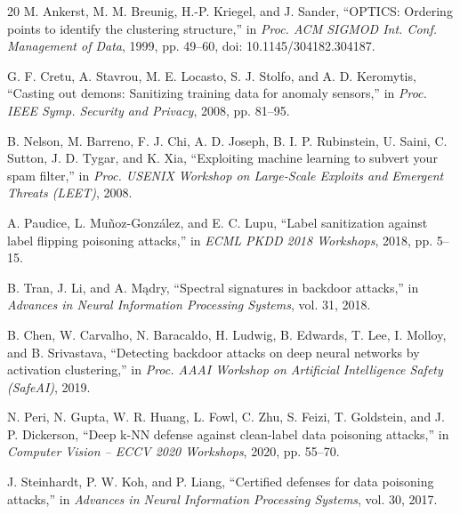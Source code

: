 \documentclass[conference]{IEEEtran}
\begin{document}
\begin{thebibliography}{20}
M. Ankerst, M. M. Breunig, H.-P. Kriegel, and J. Sander, ``OPTICS: Ordering
points to identify the clustering structure,'' in \emph{Proc. ACM SIGMOD Int.
Conf. Management of Data}, 1999, pp. 49--60,
doi: 10.1145/304182.304187.

G. F. Cretu, A. Stavrou, M. E. Locasto, S. J. Stolfo, and A. D. Keromytis, ``Casting
out demons: Sanitizing training data for anomaly sensors,'' in \emph{Proc. IEEE Symp.
Security and Privacy}, 2008, pp. 81--95.

B. Nelson, M. Barreno, F. J. Chi, A. D. Joseph, B. I. P. Rubinstein, U. Saini,
C. Sutton, J. D. Tygar, and K. Xia, ``Exploiting machine learning to subvert your spam
filter,'' in \emph{Proc. USENIX Workshop on Large-Scale Exploits and Emergent Threats
(LEET)}, 2008.

A. Paudice, L. Mu\~{n}oz-Gonz\'{a}lez, and E. C. Lupu, ``Label sanitization against
label flipping poisoning attacks,'' in \emph{ECML PKDD 2018 Workshops}, 2018,
pp. 5--15.

B. Tran, J. Li, and A. M\k{a}dry, ``Spectral signatures in backdoor attacks,'' in
\emph{Advances in Neural Information Processing Systems}, vol. 31, 2018.

B. Chen, W. Carvalho, N. Baracaldo, H. Ludwig, B. Edwards, T. Lee, I. Molloy, and
B. Srivastava, ``Detecting backdoor attacks on deep neural networks by activation
clustering,'' in \emph{Proc. AAAI Workshop on Artificial Intelligence Safety (SafeAI)},
2019.

N. Peri, N. Gupta, W. R. Huang, L. Fowl, C. Zhu, S. Feizi, T. Goldstein, and
J. P. Dickerson, ``Deep k-NN defense against clean-label data poisoning attacks,'' in
\emph{Computer Vision -- ECCV 2020 Workshops}, 2020, pp. 55--70.

J. Steinhardt, P. W. Koh, and P. Liang, ``Certified defenses for data poisoning
attacks,'' in \emph{Advances in Neural Information Processing Systems}, vol. 30, 2017.

\end{thebibliography}
\end{document}
